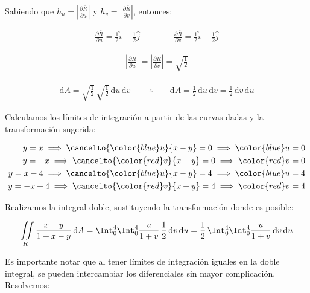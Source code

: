 \documentclass[12pt]{article}
\begin{document}
\noindent Sabiendo que $h_u = |\frac{\partial \overline{R}}{\partial u}|$ y $h_v = |\frac{\partial \overline{R}}{\partial v}|$, entonces:

\begin{align*}
	\frac{\partial \overline{R}}{\partial u} = \frac{1}{2}\hat{i} + \frac{1}{2}\hat{j} \qquad \qquad
	\frac{\partial \overline{R}}{\partial v} = \frac{1}{2}\hat{i} - \frac{1}{2}\hat{j}
\end{align*}

\begin{align*}
	\left|\frac{\partial \overline{R}}{\partial u}\right| = \left|\frac{\partial \overline{R}}{\partial v}\right| = \sqrt{\frac{1}{2}}
\end{align*}

\begin{align*}
	\mathrm{d}A = \sqrt{\frac{1}{2}}\,\sqrt{\frac{1}{2}}\, \mathrm{d}u\,\mathrm{d}v\, \qquad \therefore \qquad \mathrm{d}A = \frac{1}{2}\,\mathrm{d}u\,\mathrm{d}v = \frac{1}{2}\,\mathrm{d}v\,\mathrm{d}u
\end{align*}

\noindent Calculamos los límites de integración a partir de las curvas dadas y la transformación sugerida:

\begin{align*}
	y = x  \implies \cancelto{{\color{blue}u}}{x-y} = 0 \implies {\color{blue}u} = 0 \\
	y = -x \implies \cancelto{{\color{red}v}}{x+y} = 0 \implies {\color{red}v} = 0 \\
	y = x - 4 \implies \cancelto{{\color{blue}u}}{x-y} = 4 \implies {\color{blue}u} = 4 \\
	y = -x + 4 \implies \cancelto{{\color{red}v}}{x+y} = 4 \implies {\color{red}v} = 4 \\
\end{align*}

\noindent Realizamos la integral doble, sustituyendo la transformación donde es posible:

\begin{equation*}
	 \iint\limits_R \frac{x+y}{1+x-y}\, \mathrm{d}A = \Int_0^4\Int_0^4 \frac{u}{1+v}\, \frac{1}{2}\,\mathrm{d}v\,\mathrm{d}u = \frac{1}{2}\,\Int_0^4\Int_0^4 \frac{u}{1+v}\, \mathrm{d}v\,\mathrm{d}u 
\end{equation*}

\noindent Es importante notar que al tener límites de integración iguales en la doble integral, se pueden intercambiar los diferenciales sin mayor complicación. Resolvemos:
\end{document}
